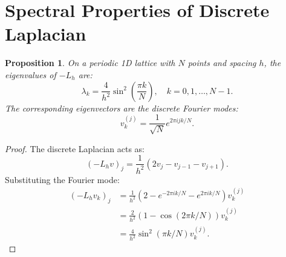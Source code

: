 \documentclass[11pt,a4paper]{article}
\newcommand{\laph}{L_h}
\theoremstyle{plain}
\newtheorem{proposition}[theorem]{Proposition}
\theoremstyle{definition}
\theoremstyle{remark}
\begin{document}
\section{Spectral Properties of Discrete Laplacian}\label{app:spectral}

\begin{proposition}
On a periodic 1D lattice with $N$ points and spacing $h$, the eigenvalues of $-\laph$ are:
\begin{equation}
    \lambda_k = \frac{4}{h^2}\sin^2\left(\frac{\pi k}{N}\right), \quad k = 0, 1, \ldots, N-1.
\end{equation}
The corresponding eigenvectors are the discrete Fourier modes:
\begin{equation}
    v_k^{(j)} = \frac{1}{\sqrt{N}} e^{2\pi i jk/N}.
\end{equation}
\end{proposition}

\begin{proof}
The discrete Laplacian acts as:
\begin{equation}
    (-\laph v)_j = \frac{1}{h^2}(2v_j - v_{j-1} - v_{j+1}).
\end{equation}
Substituting the Fourier mode:
\begin{align}
    (-\laph v_k)_j &= \frac{1}{h^2}(2 - e^{-2\pi ik/N} - e^{2\pi ik/N})v_k^{(j)}\\
    &= \frac{2}{h^2}(1 - \cos(2\pi k/N))v_k^{(j)}\\
    &= \frac{4}{h^2}\sin^2(\pi k/N)v_k^{(j)}.
\end{align}
\end{proof}
\end{document}
